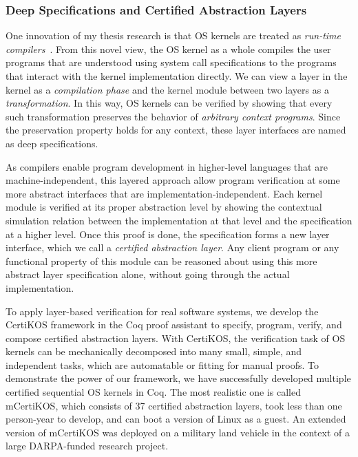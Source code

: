 \documentclass[a4paper, 10pt]{article}
\begin{document}
\begin{small}
\subsubsection*{\small Deep Specifications and Certified Abstraction Layers}
\begin{comment}
Modern OS kernels are designed and constructed using a
stack of \emph{abstraction layers},
each of which defines an interface that hides the underlying implementation
details. Client programs can be understood solely based on the interface,
independent of the layer implementation. Despite their huge contributions
to the computer industry,
abstraction layers have mostly been treated as a system
concept; before our work, they have almost never been formally specified or verified.
\end{comment}
One innovation of my thesis research is that  OS kernels are treated as \emph{run-time compilers}~\cite{popl15-gu}.
From this novel view,
the OS kernel as a whole compiles the
user programs that are understood using system call specifications  to the programs that interact 
with the kernel implementation directly.
We can view a layer in the kernel as a \emph{compilation phase}
and the kernel module between two layers as a \emph{transformation}.
In this way,  OS kernels can be verified by showing that
every such transformation
preserves the behavior of \emph{arbitrary context programs}.
Since the preservation property holds for any context,
these layer interfaces are named
as deep specifications. 


As compilers enable program development
in higher-level languages that are machine-independent,
this layered approach allow program verification 
at some more abstract interfaces that are implementation-independent. Each kernel module is verified
at its proper abstraction level by showing the contextual
simulation relation between the implementation at that level
and the specification at a higher level.
Once this proof is done, the specification forms a new layer interface, which we call a \emph{certified abstraction layer}.
Any client program or any functional property of this module
can be reasoned about using this more abstract  layer specification alone, without going through the actual implementation.

To apply layer-based verification for real software systems,
we develop the CertiKOS framework in the Coq proof assistant
to specify, program, verify, and compose certified abstraction
layers. With CertiKOS, the verification task of OS kernels
can be mechanically decomposed into many small, simple, and
independent tasks, which are automatable or fitting for manual proofs.
To demonstrate the power of our framework,
 we have successfully developed multiple certified
sequential OS kernels in Coq. 
The most realistic one is called mCertiKOS,
which consists of 37 certified abstraction layers, 
took less than one person-year to develop,
and can boot a version of Linux as a guest.
An extended version of mCertiKOS was deployed on a military land vehicle in the context of a large DARPA-funded research project.


\end{small}
\end{document}
